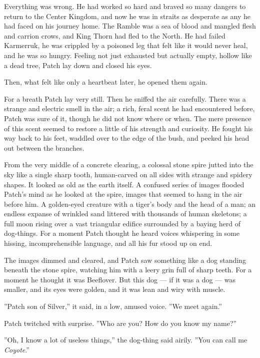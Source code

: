 \documentclass[12pt]{book}
\begin{document}
Everything was wrong. He had worked so hard and braved so many dangers to return to the Center Kingdom, and now he was in straits as desperate as any he had faced on his journey home. The Ramble was a sea of blood and mangled flesh and carrion crows, and King Thorn had fled to the North. He had failed Karmerruk, he was crippled by a poisoned leg that felt like it would never heal, and he was so hungry. Feeling not just exhausted but actually empty, hollow like a dead tree, Patch lay down and closed his eyes.

Then, what felt like only a heartbeat later, he opened them again.

For a breath Patch lay very still. Then he sniffed the air carefully. There was a strange and electric smell in the air; a rich, feral scent he had encountered before, Patch was sure of it, though he did not know where or when. The mere presence of this scent seemed to restore a little of his strength and curiosity. He fought his way back to his feet, waddled over to the edge of the bush, and peeked his head out between the branches.

From the very middle of a concrete clearing, a colossal stone spire jutted into the sky like a single sharp tooth, human-carved on all sides with strange and spidery shapes. It looked as old as the earth itself. A confused series of images flooded Patch's mind as he looked at the spire, images that seemed to hang in the air before him. A golden-eyed creature with a tiger's body and the head of a man; an endless expanse of wrinkled sand littered with thousands of human skeletons; a full moon rising over a vast triangular edifice surrounded by a baying herd of dog-things. For a moment Patch thought he heard voices whispering in some hissing, incomprehensible language, and all his fur stood up on end.

The images dimmed and cleared, and Patch saw something like a dog standing beneath the stone spire, watching him with a leery grin full of sharp teeth. For a moment he thought it was Beeflover. But this dog ---
if it was a dog ---
was smaller, and its eyes were golden, and it was lean and wiry with muscle.

''Patch son of Silver,'' it said, in a low, amused voice. ''We meet again.''

Patch twitched with surprise. ''Who are you? How do you know my name?''

''Oh, I know a lot of useless things,'' the dog-thing said airily. ''You can call me {\it Coyote}.''
\end{document}
